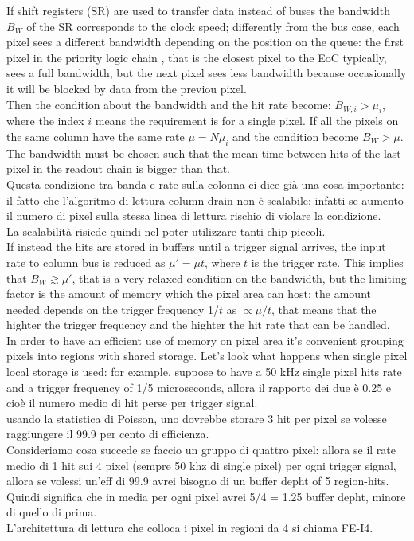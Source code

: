 If shift registers (SR) are used to transfer data instead of buses the bandwidth $B_W$
of the SR corresponds to the clock speed; differently from the bus case, each pixel
sees a different bandwidth depending on the position on the queue: the first pixel
in the priority logic chain , that is the closest pixel to the EoC typically,
sees a full bandwidth, but the next pixel sees less bandwidth because
occasionally it will be blocked by data from the previou pixel.\\
Then the condition about the bandwidth and the hit rate become: $B_{W,i} > \mu_{i}$,
where the index $i$ means the requirement is for a single pixel. If all the pixels
on the same column
have the same rate $\mu = N\mu_{i}$ and the condition become $B_{W} > \mu$.
The bandwidth must be chosen such that the mean time between hits of the last pixel
in the readout chain is bigger than that.\\
Questa condizione tra banda e rate sulla colonna ci dice già una cosa importante:
il fatto che l'algoritmo di lettura column drain non è scalabile: infatti se aumento
il numero di pixel sulla stessa linea di lettura rischio di violare la condizione.\\
La scalabilità risiede quindi nel poter utilizzare tanti chip piccoli.\\


If instead the hits are stored in buffers until a trigger signal arrives, the input rate
to column bus is reduced as $\mu'=\mu t$, where $t$ is the trigger rate.
This implies that $B_{W} \gtrsim \mu'$, that is a very relaxed condition on the
bandwidth, but the limiting factor is the amount of memory  which the pixel area
can host; the amount needed depends on the trigger frequency 1/$t$ as
$\propto\mu/t$, that means that the highter the trigger frequency and the highter
the hit rate that can be handled. \\
In order to have an efficient use of memory on pixel area it's convenient
grouping pixels into regions with shared storage. Let's look what happens when
single pixel local storage is used: for example, suppose to have a 50 kHz single
pixel hits rate and a trigger frequency of 1/5 microseconds, allora il rapporto dei due
è 0.25 e cioè il numero medio di hit perse per trigger signal.\\
usando la statistica di Poisson, uno dovrebbe storare 3 hit per pixel se volesse
raggiungere il 99.9 per cento di efficienza.\\
Consideriamo cosa succede se faccio un gruppo di quattro pixel: allora se il rate
medio di 1 hit sui 4 pixel (sempre 50 khz di single pixel) per ogni trigger signal, allora se volessi un'eff di 99.9
avrei bisogno di un buffer depht of 5 region-hits. Quindi significa che in media per
ogni pixel avrei 5/4 = 1.25 buffer depht, minore di quello di prima.\\
L'architettura di lettura che colloca i pixel in regioni da 4 si chiama FE-I4.\\

